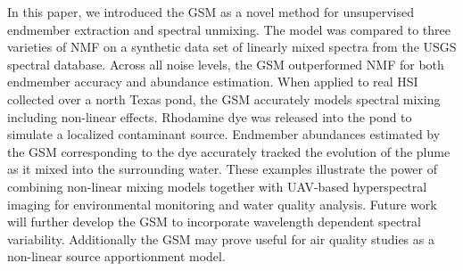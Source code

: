 \documentclass[remotesensing,article,submit,pdftex,moreauthors]{Definitions/mdpi}
\begin{document}
In this paper, we introduced the GSM as a novel method for unsupervised endmember extraction and spectral unmixing. The model was compared to three varieties of NMF on a synthetic data set of linearly mixed spectra from the USGS spectral database. Across all noise levels, the GSM outperformed NMF for both endmember accuracy and abundance estimation. When applied to real HSI collected over a north Texas pond, the GSM accurately models spectral mixing including non-linear effects. Rhodamine dye was released into the pond to simulate a localized contaminant source. Endmember abundances estimated by the GSM corresponding to the dye accurately tracked the evolution of the plume as it mixed into the surrounding water. These examples illustrate the power of combining non-linear mixing models together with UAV-based hyperspectral imaging for environmental monitoring and water quality analysis. Future work will further develop the GSM to incorporate wavelength dependent spectral variability. Additionally the GSM may prove useful for air quality studies as a non-linear source apportionment model.





\vspace{6pt} 




\end{document}

